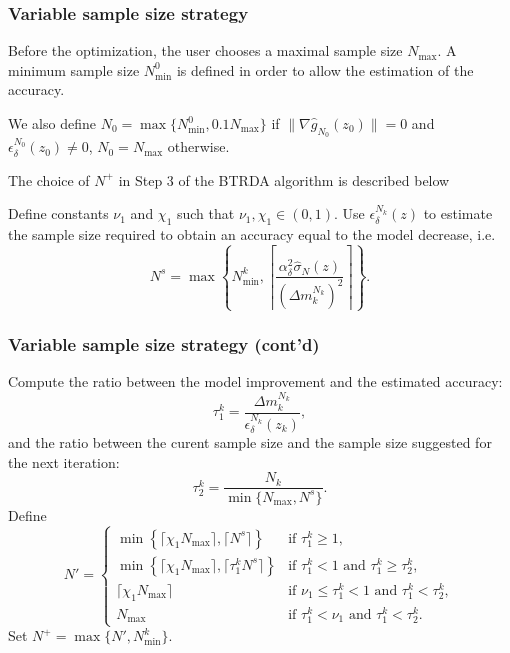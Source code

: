 \documentclass{beamer}
\begin{document}
\begin{frame}
\frametitle{Variable sample size strategy}

Before the optimization, the user chooses a maximal sample size $N_{\max}$.
A minimum sample size $N^0_{\min}$ is defined in order to allow the estimation of the accuracy.

\mbox{}

We also define $N_0 = \max\lbrace N^0_{\min}, 0.1N_{\max}\rbrace$ if $\| \nabla \hat{g}_{N_0}(z_0) \| = 0$ and $\epsilon_{\delta}^{N_0}(z_0) \ne 0$, $N_0 = N_{\max}$ otherwise.

\mbox{}

The choice of $N^+$ in Step 3 of the BTRDA algorithm is described below

\mbox{}

Define constants $\nu_1$ and $\chi_1$ such that $\nu_1, \chi_1 \in (0,1)$.
Use $\epsilon_{\delta}^{N_k}(z)$ to estimate the sample size required to obtain an accuracy equal to the model decrease, i.e.
\[
N^s = \max \left\lbrace N^k_{\min},
\left\lceil
\frac{\alpha^2_{\delta}  \hat{\sigma}_N(z)}{(\Delta m_k^{N_k})^2}
\right\rceil \right\rbrace.
\]

\end{frame}

\begin{frame}
\frametitle{Variable sample size strategy (cont'd)}

Compute the ratio between the model improvement and the estimated accuracy:
\[
\tau_1^k = \frac{\Delta m_k^{N_k}}{\epsilon_\delta^{N_k} (z_k)},
\]
and the ratio between the curent sample size and the sample size suggested for the next iteration:\[
\tau_2^k = \frac{N_k}{\min \lbrace N_{\max}, N^s \rbrace}.
\]
Define
\[
N' =
\begin{cases}
 \min \left\lbrace \lceil \chi_1 N_{\max} \rceil, \lceil N^s
 \rceil \right\rbrace & \text{if } \tau_1^k \geq 1, \\
 \min \left\lbrace \lceil \chi_1 N_{\max} \rceil, \lceil \tau_1^kN^s
 \rceil  \right\rbrace &  \text{if } \tau_1^k < 1 \text{ and }
 \tau_1^k \geq  \tau_2^k,\\
 \lceil \chi_1 N_{\max} \rceil & \text{if }  \nu_1 \leq \tau_1^k <
 1\text{ and }\tau_1^k < \tau_2^k,\\
 N_{\max} & \text{if } \tau_1^k < \nu_1\text{ and }\tau_1^k < \tau_2^k.
\end{cases}
\]
Set $N^+ = \max\lbrace N', N^k_{\min}\rbrace$.

\end{frame}
\end{document}
